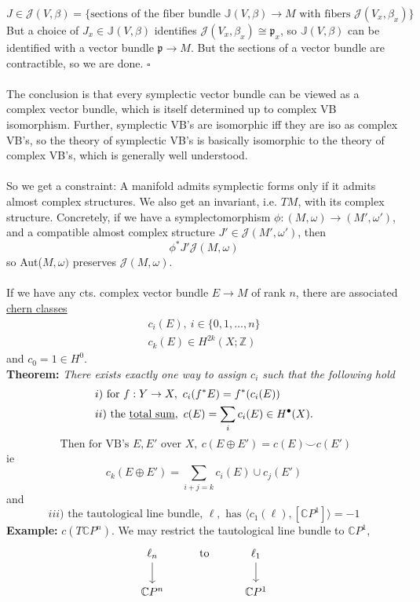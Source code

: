\documentclass[12pt]{report}
\theoremstyle{definition}
\theoremstyle{remark}
\numberwithin{equation}{section}
\theoremstyle{definition}
\newcommand{\bb}[1]{\mathbb{#1}}
\newcommand{\mqed}{\hfill\newline\null \hfill$\square$\\ }
\begin{document}
$$
	J \in \mathcal{J}(V,\beta) = \{\text{sections of the fiber bundle } \bb J(V,\beta) \to M \text{ with fibers } \mathcal{J}(V_x,\beta_x)\}
$$
But a choice of $J_x \in \bb J(V,\beta)$ identifies $\mathcal{J}(V_x,\beta_x) \cong \mathfrak{p}_x$, so $\bb J(V,\beta)$ can be identified with a vector bundle $\mathfrak{p}\to M$. But the sections of a vector bundle are contractible, so we are done. \mqed\\
The conclusion is that every symplectic vector bundle can be viewed as a complex vector bundle, which is itself determined up to complex VB isomorphism. Further, symplectic VB's are isomorphic iff they are iso as complex VB's, so the theory of symplectic VB's is basically isomorphic to the theory of complex VB's, which is generally well understood. \\\\
So we get a constraint: A manifold admits symplectic forms only if it admits almost complex structures. We also get an invariant, i.e. $TM$, with its complex structure. Concretely, if we have a symplectomorphism $\phi: (M,\omega) \to (M', \omega')$, and a compatible almost complex structure $J' \in \mathcal{J}(M', \omega')$, then 
$$
	\phi^*J' \mathcal{J}(M,\omega)
$$
so Aut($M,\omega)$ preserves $\mathcal{J}(M,\omega)$. \\\\
If we have any cts. complex vector bundle $E \to M$ of rank $n$, there are associated \underline{chern classes} 
\begin{gather*}
	c_i(E),\ i \in \{0,1,\dots,n\}\\
	c_k(E) \in H^{2k}(X; \bb Z)
\end{gather*}
and $c_0 = 1 \in H^0$. \\
\textbf{Theorem: }\textit{There exists exactly one way to assign $c_i$ such that the following hold}
\begin{alignat*}{1}
	&i) \text{ for } f: Y \to X,\ c_i(f^*E) = f^*(c_i(E))\\
	&ii)\ \text{the \underline{total sum}},\ c(E) = \sum_i c_i(E) \in H^\bullet (X).
\end{alignat*}
$$
\text{ Then for VB's } E,E' \text{ over } X,\ c(E \oplus E') = c(E) \smile c(E') 
$$
ie 
$$
	c_k(E \oplus E') = \sum_{i + j = k} c_i(E) \cup c_j(E') 
$$
and 
$$
iii) \text{ the tautological line bundle, } \ell, \text{ has } \langle c_1(\ell), [\bb CP^1]\rangle = -1
$$
\textbf{Example: } $c(T \bb CP^n)$. We may restrict the tautological line bundle to $\bb CP^1$, 
$$
\begin{tikzcd}
\ell_n \arrow[d] & \text{to} & \ell_1 \arrow[d] \\
\bb CP^n       &           & \bb CP^1      
\end{tikzcd}
$$
\end{document}
